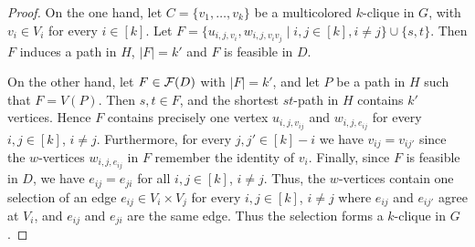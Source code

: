 \begin{proof}
  On the one hand, let $C=\{v_1,\ldots,v_k\}$ be a
  multicolored $k$-clique in $G$, with $v_i \in V_i$ for every $i \in [k]$.
  Let $F=\{u_{i,j,v_i}, w_{i,j,v_iv_j} \mid i, j \in [k], i \neq j\} \cup \{s,t\}$.
  Then $F$ induces a path in $H$, $|F|=k'$ and $F$ is feasible in $D$. 
  
  On the other hand, let $F \in \mathcal F(D)$ with $|F|=k'$, and let $P$ be a
  path in $H$ such that $F=V(P)$. Then $s, t \in F$, and the shortest
  $st$-path in $H$ contains $k'$ vertices. Hence $F$ contains precisely
  one vertex $u_{i,j,v_{ij}}$ and $w_{i,j,e_{ij}}$ for every $i, j \in [k]$, $i \neq j$.
  Furthermore, for every $j, j' \in [k]-i$ we have $v_{ij}=v_{ij'}$
  since the $w$-vertices $w_{i,j,e_{ij}}$ in $F$ remember the identity of $v_i$.
  Finally, since $F$ is feasible in $D$, we have $e_{ij}=e_{ji}$
  for all $i, j \in [k]$, $i \neq j$.
  Thus, the $w$-vertices contain one selection of an edge $e_{ij} \in V_i \times V_j$
  for every $i, j \in [k]$, $i \neq j$ where $e_{ij}$ and $e_{ij'}$ agree at $V_i$, 
  and $e_{ij}$ and $e_{ji}$ are the same edge. Thus the selection forms
  a $k$-clique in $G$.
\end{proof}



